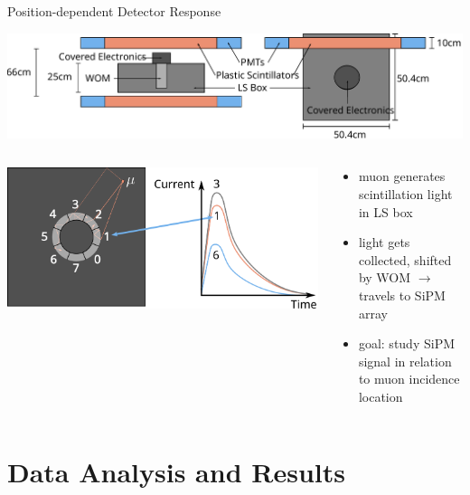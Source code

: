 \documentclass[aspectratio=169]{beamer}
\begin{document}
	\begin{frame}{Position-dependent Detector Response}
		\centering
		
		\includegraphics[width=.8\textwidth]{pictures/cosmics.pdf}
		
		\begin{columns}
			\begin{column}{.5\textwidth}
				\centering
				\includegraphics[width=1\textwidth]{pictures/detector-response.pdf}	
			\end{column}
		
			\begin{column}{.5\textwidth}
				\begin{itemize}
					\item muon generates scintillation light in LS box
					\item light gets collected, shifted by WOM $\rightarrow$ travels to SiPM array
					\item goal: study SiPM signal in relation to muon incidence location
				\end{itemize}
			\end{column}
		
		\end{columns}
	
	\end{frame}

	
	
	
	
	\section{Data Analysis and Results}
	
\end{document}
